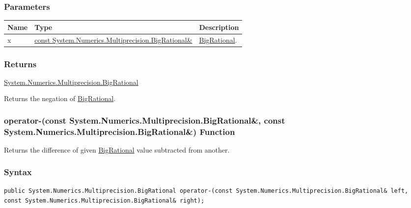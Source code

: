 \documentclass[a4paper,oneside,11.000000pt]{book}
\begin{document}
\subsubsection*{Parameters}
\begin{flushleft}
\begin{supertabular}[l]{!{\raggedright}p{1.30721cm}!{\raggedright}p{8.55945cm}!{\raggedright}p{3.10422cm}}
\textbf{Name}
& \textbf{Type}
& \textbf{Description}
\\
\hline
x
& \hyperlink{System.Numerics.Multiprecision.BigRational}{const System.\-Numerics.\-Multiprecision.\-BigRational\&\-}
& \hyperlink{System.Numerics.Multiprecision.BigRational}{BigRational}.

\\
\end{supertabular}

\end{flushleft}
\subsubsection*{Returns}
\hyperlink{System.Numerics.Multiprecision.BigRational}{System.\-Numerics.\-Multiprecision.\-BigRational}
\begin{flushleft}
Returns the negation of \hyperlink{System.Numerics.Multiprecision.BigRational}{BigRational}.

\end{flushleft}
\clearpage

\hypertarget{System.Numerics.Multiprecision.operator.minus.C.R.System.Numerics.Multiprecision.BigRational.C.R.System.Numerics.Multiprecision.BigRational}{\subsubsection*{operator-(const System.Numerics.Multiprecision.BigRational\&, const System.Numerics.Multiprecision.BigRational\&) Function}}
\begin{flushleft}
Returns the difference of given \hyperlink{System.Numerics.Multiprecision.BigRational}{BigRational} value subtracted from another.

\end{flushleft}
\subsubsection*{Syntax}
\texttt{public System.Numerics.Multiprecision.BigRational operator-(const System.Numerics.Multiprecision.BigRational\& left, const System.Numerics.Multiprecision.BigRational\& right);}
\end{document}
